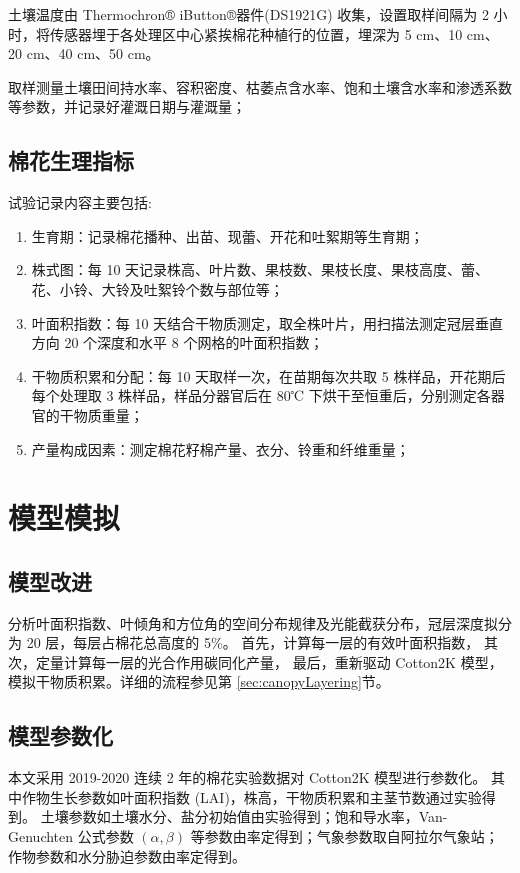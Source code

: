 土壤温度由 Thermochron® iButton®器件(DS1921G) 收集，设置取样间隔为 2 小时，将传感器埋于各处理区中心紧挨棉花种植行的位置，埋深为 5 cm、10 cm、20 cm、40 cm、50 cm。

取样测量土壤田间持水率、容积密度、枯萎点含水率、饱和土壤含水率和渗透系数等参数，并记录好灌溉日期与灌溉量；
\subsection{棉花生理指标}
试验记录内容主要包括:
\begin{enumerate}
    \item 生育期：记录棉花播种、出苗、现蕾、开花和吐絮期等生育期；
    \item 株式图：每 10 天记录株高、叶片数、果枝数、果枝长度、果枝高度、蕾、花、小铃、大铃及吐絮铃个数与部位等；
    \item 叶面积指数：每 10 天结合干物质测定，取全株叶片，用扫描法测定冠层垂直方向 20 个深度和水平 8 个网格的叶面积指数；
    \item 干物质积累和分配：每 10 天取样一次，在苗期每次共取 5 株样品，开花期后每个处理取 3 株样品，样品分器官后在 80℃ 下烘干至恒重后，分别测定各器官的干物质重量；
    \item 产量构成因素：测定棉花籽棉产量、衣分、铃重和纤维重量；
\end{enumerate}

\section{模型模拟}
\subsection{模型改进}

分析叶面积指数、叶倾角和方位角的空间分布规律及光能截获分布，冠层深度拟分为 20 层，每层占棉花总高度的 5\%。
首先，计算每一层的有效叶面积指数，%
其次，定量计算每一层的光合作用碳同化产量，%
最后，重新驱动 Cotton2K 模型，模拟干物质积累。详细的流程参见第 \ref{sec:canopyLayering}节。

\subsection{模型参数化}
本文采用 2019-2020 连续 2 年的棉花实验数据对 Cotton2K 模型进行参数化。
其中作物生长参数如叶面积指数 (LAI)，株高，干物质积累和主茎节数通过实验得到。
土壤参数如土壤水分、盐分初始值由实验得到；饱和导水率，Van-Genuchten
公式参数 $(\alpha, \beta)$ 等参数由率定得到；气象参数取自阿拉尔气象站；
作物参数和水分胁迫参数由率定得到。

